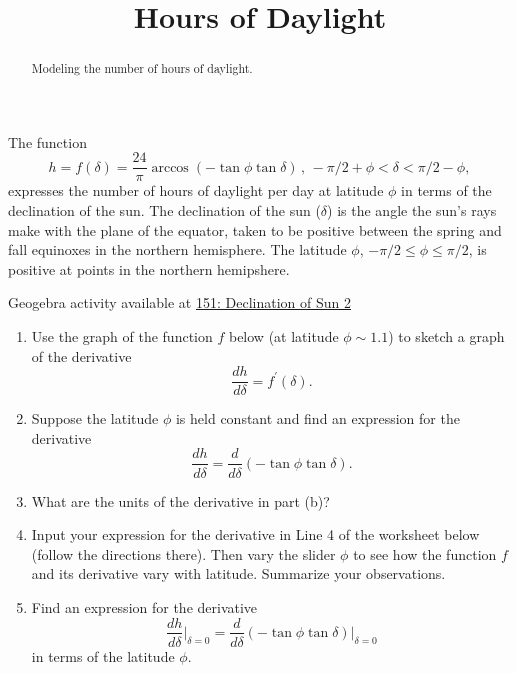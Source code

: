 \documentclass{ximera}
\title{Hours of Daylight}
\begin{document}
\begin{abstract}
Modeling the number of hours of daylight.
\end{abstract}
\maketitle


\begin{question}  \label{Q:er43455}
The function
\[
    h = f(\delta) = \frac{24}{\pi} \arccos(-\tan\phi \tan\delta) \, , \, -\pi/2+\phi < \delta < \pi/2-\phi ,
\]
expresses the number of hours of daylight per day at latitude $\phi$ in terms of the declination of the sun. The declination of the sun ($\delta$) is the angle the sun's rays make with the plane of the equator, taken to be positive between the spring and fall equinoxes in the northern hemisphere. The latitude $\phi$, $-\pi/2 \leq \phi \leq \pi/2$, is positive at points in the northern hemipshere.

\begin{onlineOnly}
    \begin{center}
\end{center}
\end{onlineOnly}

Geogebra activity available at \href{https://www.geogebra.org/classic/vnhrutwu}{151: Declination of Sun 2}

\begin{enumerate}
\item Use the graph of the function $f$ below (at latitude $\phi \sim 1.1$) to sketch a graph of the derivative
\[
   \frac{dh}{d\delta} = f^\prime(\delta) .
\]

\item Suppose the latitude $\phi$ is held constant and find an expression for the derivative 
\[
   \frac{dh}{d\delta} = \frac{d}{d\delta} \left(  -\tan\phi \tan \delta    \right).
\]

\item What are the units of the derivative in part (b)?

\item Input your expression for the derivative in Line 4 of the worksheet below (follow the directions there). Then vary the slider $\phi$ to see how the function $f$ and its derivative vary with latitude. Summarize your observations.

\item Find an expression for the derivative 
\[
   \frac{dh}{d\delta}\Big|_{\delta = 0} =  \frac{d}{d\delta} \left(  -\tan\phi \tan \delta    \right)\Big|_{\delta =0}
\]
in terms of the latitude $\phi$. 


\end{enumerate}
\end{question}
\end{document}
